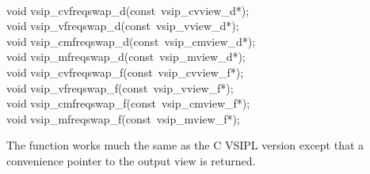 \\\cvsiplh
\begin{cfuncs}
void vsip\_cvfreqswap\_d(const~vsip\_cvview\_d*);\Bs\\
void vsip\_vfreqswap\_d(const~vsip\_vview\_d*);\Bs\\
void vsip\_cmfreqswap\_d(const~vsip\_cmview\_d*);\Bs\\
void vsip\_mfreqswap\_d(const~vsip\_mview\_d*);\Bs\\
void vsip\_cvfreqswap\_f(const~vsip\_cvview\_f*);\Bs\\
void vsip\_vfreqswap\_f(const~vsip\_vview\_f*);\Bs\\
void vsip\_cmfreqswap\_f(const~vsip\_cmview\_f*);\Bs\\
void vsip\_mfreqswap\_f(const~vsip\_mview\_f*);\Bs\\
\end{cfuncs}
\pyjvsiph
{}
\begin{comments}
\item{The  function works much the same as the C VSIPL version except that a convenience pointer to the output view is returned.}
\end{comments}
